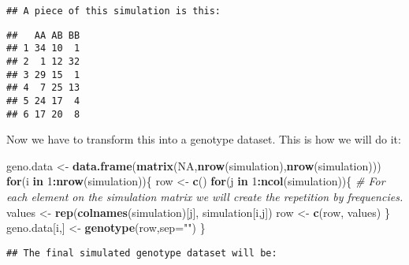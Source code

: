 \documentclass[]{article}
\newenvironment{Shaded}{\begin{snugshade}}{\end{snugshade}}
\newcommand{\KeywordTok}[1]{\textcolor[rgb]{0.13,0.29,0.53}{\textbf{#1}}}
\newcommand{\DataTypeTok}[1]{\textcolor[rgb]{0.13,0.29,0.53}{#1}}
\newcommand{\DecValTok}[1]{\textcolor[rgb]{0.00,0.00,0.81}{#1}}
\newcommand{\StringTok}[1]{\textcolor[rgb]{0.31,0.60,0.02}{#1}}
\newcommand{\CommentTok}[1]{\textcolor[rgb]{0.56,0.35,0.01}{\textit{#1}}}
\newcommand{\OtherTok}[1]{\textcolor[rgb]{0.56,0.35,0.01}{#1}}
\newcommand{\ControlFlowTok}[1]{\textcolor[rgb]{0.13,0.29,0.53}{\textbf{#1}}}
\newcommand{\OperatorTok}[1]{\textcolor[rgb]{0.81,0.36,0.00}{\textbf{#1}}}
\newcommand{\NormalTok}[1]{#1}
\begin{document}
\begin{verbatim}
## A piece of this simulation is this:
\end{verbatim}

\begin{verbatim}
##   AA AB BB
## 1 34 10  1
## 2  1 12 32
## 3 29 15  1
## 4  7 25 13
## 5 24 17  4
## 6 17 20  8
\end{verbatim}

Now we have to transform this into a genotype dataset. This is how we
will do it:

\begin{Shaded}
\begin{Highlighting}[]
\NormalTok{geno.data <-}\StringTok{ }\KeywordTok{data.frame}\NormalTok{(}\KeywordTok{matrix}\NormalTok{(}\OtherTok{NA}\NormalTok{,}\KeywordTok{nrow}\NormalTok{(simulation),}\KeywordTok{nrow}\NormalTok{(simulation)))}
\ControlFlowTok{for}\NormalTok{(i }\ControlFlowTok{in} \DecValTok{1}\OperatorTok{:}\KeywordTok{nrow}\NormalTok{(simulation))\{}
\NormalTok{  row <-}\StringTok{ }\KeywordTok{c}\NormalTok{()}
  \ControlFlowTok{for}\NormalTok{(j }\ControlFlowTok{in} \DecValTok{1}\OperatorTok{:}\KeywordTok{ncol}\NormalTok{(simulation))\{}
    \CommentTok{# For each element on the simulation matrix we will create the repetition by frequencies.}
\NormalTok{    values <-}\StringTok{ }\KeywordTok{rep}\NormalTok{(}\KeywordTok{colnames}\NormalTok{(simulation)[j], simulation[i,j])}
\NormalTok{    row <-}\StringTok{ }\KeywordTok{c}\NormalTok{(row, values)}
\NormalTok{  \}}
\NormalTok{  geno.data[i,] <-}\StringTok{ }\KeywordTok{genotype}\NormalTok{(row,}\DataTypeTok{sep=}\StringTok{""}\NormalTok{)}
\NormalTok{\}}
\end{Highlighting}
\end{Shaded}

\begin{verbatim}
## The final simulated genotype dataset will be:
\end{verbatim}
\end{document}
